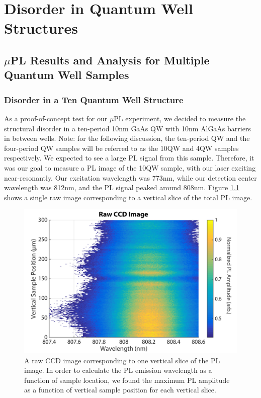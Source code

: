 \chapter{Disorder in Quantum Well Structures}

\section{$\mu$PL Results and Analysis for Multiple Quantum Well Samples}
\subsection{Disorder in a Ten Quantum Well Structure}
\indent As a proof-of-concept test for our $\mu$PL experiment, we decided to measure the structural disorder in a ten-period 10nm GaAs QW with 10nm AlGaAs barriers in between wells. Note: for the following discussion, the ten-period QW and the four-period QW samples will be referred to as the 10QW and 4QW samples respectively. We expected to see a large PL signal from this sample. Therefore, it was our goal to measure a PL image of the 10QW sample, with our laser exciting near-resonantly. Our excitation wavelength was 773nm, while our detection center wavelength was 812nm, and the PL signal peaked around 808nm. Figure \ref{raw10qw} shows a single raw image corresponding to a vertical slice of the total PL image. 
\begin{figure}[h!]
\centering
\includegraphics[width = .8\textwidth]{RAWCCDIMG.png}
\caption{ \doublespacing A raw CCD image corresponding to one vertical slice of the PL image. In order to calculate the PL emission wavelength as a function of sample location, we found the maximum PL amplitude as a function of vertical sample position for each vertical slice.}
\label{raw10qw}
\end{figure}


